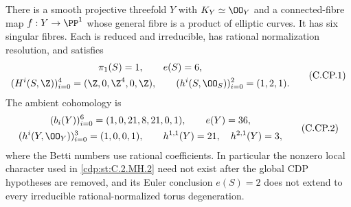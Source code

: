 
\begin{proposition}\label{cdp:st:C.2.UN.8}
There is a smooth projective threefold $Y$ with $K_Y\simeq\OO_Y$
and a connected-fibre map $f:Y\to\PP^1$ whose general fibre is a
product of elliptic curves. It has six singular fibres. Each is
reduced and irreducible, has rational normalization resolution, and
satisfies
\[
 \begin{gathered}
 \pi_1(S)=1,\qquad e(S)=6,\\
 (H^i(S,\Z))_{i=0}^4=(\Z,0,\Z^4,0,\Z),\qquad
 (h^i(S,\OO_S))_{i=0}^2=(1,2,1).
 \end{gathered}
 \tag{C.CP.1}\label{cdp:eq:C.CP.1}
\]
The ambient cohomology is
\[
 \begin{gathered}
 (b_i(Y))_{i=0}^6=(1,0,21,8,21,0,1),\qquad e(Y)=36,\\
 (h^i(Y,\OO_Y))_{i=0}^3=(1,0,0,1),\qquad
 h^{1,1}(Y)=21,\quad h^{2,1}(Y)=3,
 \end{gathered}
 \tag{C.CP.2}\label{cdp:eq:C.CP.2}
\]
where the Betti numbers use rational coefficients. In particular
the nonzero local character used in \ref{cdp:st:C.2.MH.2} need not exist after
the global CDP hypotheses are removed, and its Euler conclusion
$e(S)=2$ does not extend to every irreducible rational-normalized
torus degeneration.
\end{proposition}
